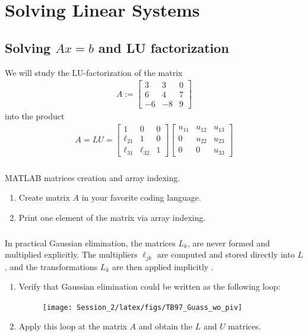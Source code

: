 \documentclass[11pt,letterpaper]{report}
\begin{document}
\chapter{Solving Linear Systems}
\section{Solving $Ax=b$ and LU factorization}
We will study the LU-factorization of the matrix
\begin{align*}
    A:=
  \begin{bmatrix}
    3  &   3   &    0\\
    6  &   4   &  7\\
    -6 &  -8   &   9
  \end{bmatrix}
\end{align*}
into the product
\begin{align*}
A = LU =
\begin{bmatrix}
1 & 0 & 0 \\
    \ell_{21} & 1 & 0\\
    \ell_{31} & \ell_{32} & 1
\end{bmatrix}
\begin{bmatrix}
    u_{11} & u_{12} & u_{13} \\
    0 & u_{22} & u_{23}\\
    0 & 0 & u_{33}
\end{bmatrix}
\end{align*}

\subsection{}
MATLAB matrices creation and array indexing.
\begin{enumerate}
    \item Create matrix $A$ in your favorite coding language.
    \item Print one element of the matrix via array indexing.
\end{enumerate}

\subsection{}
In practical Gaussian elimination, the matrices $L_k$, are never formed and multiplied explicitly. The multipliers $\ell_{jk}$ are computed and stored directly into $L$, and the transformations $L_k$ are then applied implicitly \cite[p.151]{TrefethenBau_97}.

\begin{enumerate}
    \item Verify that Gaussian elimination could be written as the following loop:
    \begin{figure}[H]
        \centering
        \texttt{[image: Session\_2/latex/figs/TB97\_Guass\_wo\_piv]}
    \end{figure}
    \item Apply this loop at the matrix $A$ and obtain the $L$ and $U$ matrices.
\end{enumerate}
\end{document}
